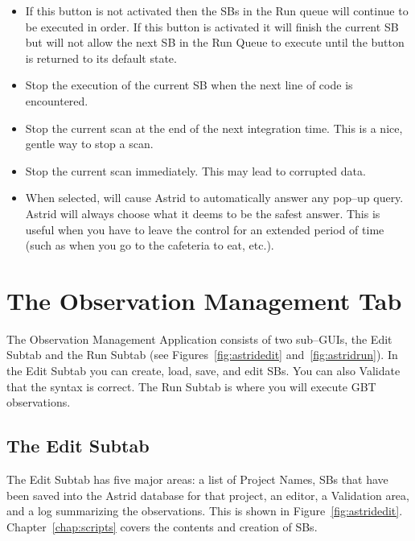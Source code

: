 \begin{itemize}[leftmargin=]
\item[\astridfixedbutton{Halt Queue}{6em}] If this button is not activated then the \glspl{SB} in the Run queue
will continue to be executed in order. If this button is activated it will finish the current
\gls{SB} but will not allow the next \gls{SB} in the Run Queue to execute until the button
is returned to its default  state.
\item[\astridfixedbutton{Pause}{6em}] Stop the execution of the current \gls{SB} when the next line of
code is encountered.
\item[\astridfixedbutton{Stop}{6em}] Stop the current scan at the end of the next integration time.
This is a nice, gentle way to stop a scan.
\item[\astridfixedbutton{Abort}{6em}] Stop the current scan immediately.  This may lead to corrupted data.
\item[\astridfixedbutton{Interactive}{6em}] When selected, will cause \gls{Astrid} to automatically
answer any pop--up query.  \gls{Astrid} will always choose what it deems
to be the safest answer.  This is useful when you have to leave the 
control for an extended period of time (such as when you go to the
cafeteria to eat, etc.).
\end{itemize}

\newpage

\section{The Observation Management Tab}

The Observation Management Application consists of two sub--\glspl{GUI},  the
Edit Subtab and the Run Subtab (see Figures~\ref{fig:astridedit} 
and~\ref{fig:astridrun}).  In the Edit Subtab you can create, load, save,
and edit \glspl{SB}.  You can also Validate that the syntax is correct.
The Run Subtab is where you will execute \gls{GBT} observations.
 
\subsection{The Edit Subtab}\label{sec:editsubtab}

The Edit Subtab has five major areas: a list of Project Names, \glspl{SB}
that have been saved into the \gls{Astrid} database for that project, an
editor, a Validation area, and a log summarizing the observations. This is
shown in Figure~\ref{fig:astridedit}. Chapter~\ref{chap:scripts} covers the
contents and creation of \glspl{SB}.

